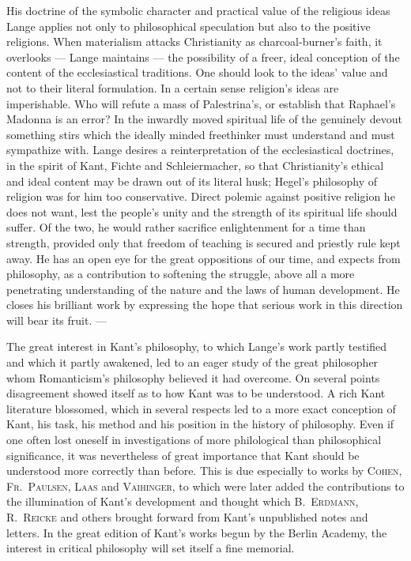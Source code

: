 \documentclass[12pt,a4paper]{book}
\newcommand{\opage}[1]{\marginnote{\footnotesize\textit{[#1]}}}
\begin{document}
His doctrine of the symbolic character and practical value of the religious ideas
Lange applies not only to philosophical speculation but also to the positive
religions. When \opage{552}materialism attacks Christianity as charcoal-burner's faith, it
overlooks --- Lange maintains --- the possibility of a freer, ideal conception of
the content of the ecclesiastical traditions. One should look to the ideas' value
and not to their literal formulation. In a certain sense religion's ideas are
imperishable. Who will refute a mass of Palestrina's, or establish that Raphael's
Madonna is an error? In the inwardly moved spiritual life of the genuinely devout
something stirs which the ideally minded freethinker must understand and must
sympathize with. Lange desires a reinterpretation of the ecclesiastical
doctrines, in the spirit of Kant, Fichte and Schleiermacher, so that
Christianity's ethical and ideal content may be drawn out of its literal husk;
Hegel's philosophy of religion was for him too conservative. Direct polemic
against positive religion he does not want, lest the people's unity and the
strength of its spiritual life should suffer. Of the two, he would rather
sacrifice enlightenment for a time than strength, provided only that freedom of
teaching is secured and priestly rule kept away. He has an open eye for the great
oppositions of our time, and expects from philosophy, as a contribution to
softening the struggle, above all a more penetrating understanding of the nature
and the laws of human development. He closes his brilliant work by expressing the
hope that serious work in this direction will bear its fruit. ---

The great interest in Kant's philosophy, to which Lange's work partly testified
and which it partly awakened, led to an eager study of the great philosopher whom
Romanticism's philosophy believed it had overcome. On several points disagreement
showed itself as to how Kant was to be understood. A rich Kant literature
blossomed, which in several respects led to a more exact conception of Kant, his
task, his method and his position in the history of philosophy. Even if one often
lost oneself in investigations of more philological than philosophical
significance, it was nevertheless of great importance that Kant should be
understood more correctly than before. This is due especially to works by
\textsc{Cohen}, \textsc{Fr.~Paulsen}, \textsc{Laas} and \textsc{Vaihinger}, to
which were later added the contributions to the illumination of Kant's
development and thought which \textsc{B.~Erdmann}, \textsc{R.~Reicke} and others
brought forward from Kant's unpublished notes and letters. In the great edition
of Kant's \opage{553}works begun by the Berlin Academy, the interest in critical philosophy
will set itself a fine memorial.
\end{document}
